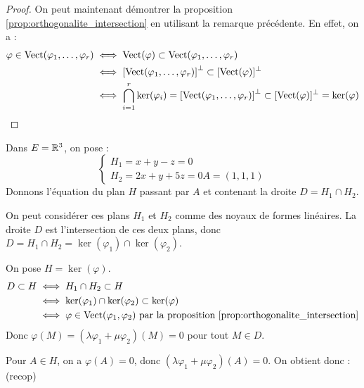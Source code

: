 \documentclass[11pt,a4paper]{report}
\begin{document}
\begin{proof}
    On peut maintenant démontrer la proposition \ref{prop:orthogonalite_intersection} en utilisant la remarque précédente. En effet, on a :
    \begin{align*}
        \varphi \in \mathrm{Vect}(\varphi_1, \dots, \varphi_r) &\iff \mathrm{Vect}(\varphi) \subset \mathrm{Vect}(\varphi_1, \dots, \varphi_r) \\
        &\iff \left[\mathrm{Vect}(\varphi_1, \dots, \varphi_r)\right]^\perp \subset [\mathrm{Vect}(\varphi)]^\perp \\
        &\iff \bigcap_{i=1}^r \ker(\varphi_i) = \left[\mathrm{Vect}(\varphi_1, \dots, \varphi_r)\right]^\perp \subset [\mathrm{Vect}(\varphi)]^\perp = \ker(\varphi)
    \end{align*}
\end{proof}

\begin{example}
    Dans $E = \mathbb{R}^3$, on pose :
    $$\begin{cases}
        H_1 = x+y-z = 0 \\
        H_2 = 2x+y+5z = 0
        A = (1,1,1)
    \end{cases}
    $$
    Donnons l'équation du plan $H$ passant par $A$ et contenant la droite $D = H_1 \cap H_2$.





    On peut considérer ces plans $H_1$ et $H_2$ comme des noyaux de formes linéaires. La droite $D$ est l'intersection de ces deux plans, donc $D = H_1 \cap H_2 = \ker(\varphi_1) \cap \ker(\varphi_2)$.

    On pose $H = \ker(\varphi)$.
    \begin{align*}
        D \subset H &\iff H_1 \cap H_2 \subset H \\
        &\iff \ker(\varphi_1) \cap \ker(\varphi_2) \subset \ker(\varphi) \\
        &\iff \varphi \in \mathrm{Vect}(\varphi_1, \varphi_2) \text{ par la proposition \ref{prop:orthogonalite_intersection}} \\
    \end{align*}
    Donc $\varphi(M) = (\lambda \varphi_1 + \mu \varphi_2)(M) = 0$ pour tout $M \in D$.

    Pour $A \in H$, on a $\varphi(A) = 0$, donc $(\lambda \varphi_1 + \mu \varphi_2)(A) = 0$. On obtient donc :
    (recop)
\end{example}
\todo
\end{document}
